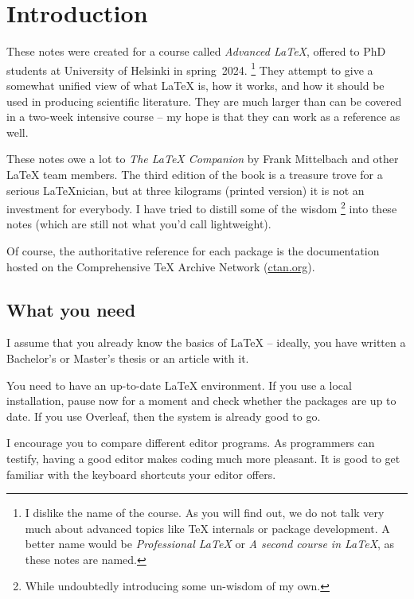 \addtocounter{chapter}{-1}
\chapter{Introduction}


These notes were created for a course called \emph{Advanced \LaTeX},
offered to PhD students at University of Helsinki in spring~2024.%
\footnote{I dislike the name of the course.
As you will find out, we do not talk very much about advanced topics like
\TeX{} internals or package development.
A better name would be \emph{Professional \LaTeX} or \emph{A second course in \LaTeX},
as these notes are named.}
They attempt to give a somewhat unified view of what \LaTeX{} is,
how it works, and how it should be used in producing scientific literature.
They are much larger than can be covered in a two-week intensive course
-- my hope is that they can work as a reference as well.

These notes owe a lot to \emph{The \LaTeX{} Companion} \cite{TLC}
by Frank Mittelbach and other \LaTeX{} team members.
The third edition of the book is a treasure trove for a serious \LaTeX nician,
but at three kilograms (printed version) it is not an investment for everybody.
I have tried to distill some of the wisdom%
\footnote{While undoubtedly introducing some un-wisdom of my own.}
into these notes (which are still not what you'd call lightweight).

Of course, the authoritative reference for each package is the documentation hosted on
the Comprehensive \TeX{} Archive Network (\url{ctan.org}).



%
%
\section{What you need}

I assume that you already know the basics of \LaTeX{}
-- ideally, you have written a Bachelor's or Master's thesis or an article with it.

You need to have an up-to-date \LaTeX{} environment.
If you use a local installation, pause now for a moment
and check whether the packages are up to date.
If you use Overleaf, then the system is already good to go.

I encourage you to compare different editor programs.
As programmers can testify, having a good editor makes coding much more pleasant.
It is good to get familiar with the keyboard shortcuts your editor offers.

